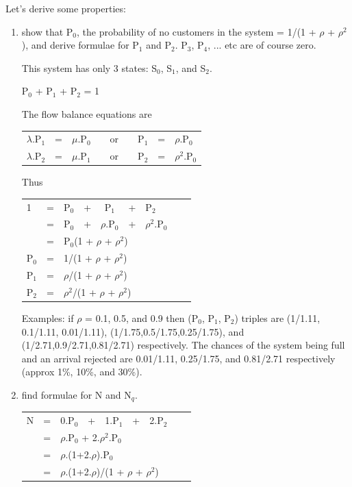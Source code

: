 \documentclass[12pt,fleqn]{report}
\begin{document}
\noindent
Let's derive some properties:

\begin{enumerate}

\item show that P$_0$, the probability of no customers in the system =
1/(1 + $\rho$ + $\rho^2$), and derive formulae for P$_1$ and P$_2$. 
P$_3$, P$_4$, ... etc are of course zero.

This system has only 3 states: S$_0$, S$_1$, and S$_2$.

P$_0$ + P$_1$ + P$_2$ = 1

The flow balance equations are 

\begin{tabular}{l c l ccc l c l}
$\lambda$.P$_1$ & = & $\mu$.P$_0$ 
   && or && P$_1$ & = & $\rho$.P$_0$\\
$\lambda$.P$_2$ & = & $\mu$.P$_1$ 
   && or && P$_2$ & = & $\rho^2$.P$_0$\\
\end{tabular}

Thus 

\begin{tabular}{l c l ccc l c l}
1  & = & P$_0$  & + & P$_1$ & + & P$_2$ \\
    & = & P$_0$  & + & $\rho$.P$_0$ & + & $\rho^2$.P$_0$ \\
    & = & \multicolumn{7}{l}{P$_0$(1 + $\rho$ + $\rho^2$)}\\[0.1in]
P$_0$ & = & \multicolumn{7}{l}{1/(1 + $\rho$ + $\rho^2$)}\\
P$_1$ & = & \multicolumn{7}{l}{$\rho$/(1 + $\rho$ + $\rho^2$)}\\
P$_2$ & = & \multicolumn{7}{l}{$\rho^2$/(1 + $\rho$ + $\rho^2$)}\\
\end{tabular}

Examples: if $\rho$ = 0.1, 0.5, and 0.9 then
(P$_0$, P$_1$, P$_2$) triples are (1/1.11, 0.1/1.11, 0.01/1.11),
(1/1.75,0.5/1.75,0.25/1.75),
and (1/2.71,0.9/2.71,0.81/2.71) respectively.
The chances of the system being full and an arrival rejected 
are 0.01/1.11, 0.25/1.75, and 0.81/2.71 respectively
(approx 1\%, 10\%, and 30\%).


\item find formulae for N and N$_q$.

\begin{tabular}{l c l ccc l c l}
N  & = & 0.P$_0$  & + & 1.P$_1$ & + & 2.P$_2$ \\
    & = & \multicolumn{7}{l}{$\rho$.P$_0$ + 2.$\rho^2$.P$_0$} \\
    & = & \multicolumn{7}{l}{$\rho$.(1+2.$\rho$).P$_0$}  \\
    & = & \multicolumn{7}{l}{$\rho$.(1+2.$\rho$)/(1 + $\rho$ + $\rho^2$)}\\[0.1in]
\end{tabular}


\end{enumerate}
\end{document}
